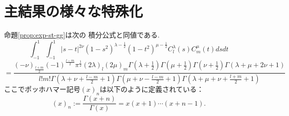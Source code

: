 \documentclass[pdf,notes]{beamer}
\newenvironment{taggedprop}[1]
 {\renewcommand\thetaggedpropx{#1}\taggedpropx}
  {\endtaggedpropx}
\begin{document}
\section{主結果の様々な特殊化}
\begin{frame}
	命題\ref{prop:exp-st-gg}は次の
	積分公式と同値である.
	\begin{taggedprop}{$\;1'$}
		\label{prop:int-st-gg}
		\begin{equation*}
			\int_{- 1}^1 \int_{- 1}^1 | s - t |^{2 \nu} (1 - s^2)^{\lambda - \frac{1}{2}}
			(1 - t^2)^{\mu - \frac{1}{2}} C_l^{\lambda} (s) C_m^{\mu} (t) d s d t
		\end{equation*}
		{\scriptsize
		\begin{equation}
			=\frac{(- \nu)_{\frac{l + m}{2}} (- 1)^{\frac{l - m}{2}} \pi^{\frac{1}{2}} (2
			\lambda)_l (2 \mu)_m \Gamma \left( \lambda + \frac{1}{2} \right) \Gamma \left(
			\mu + \frac{1}{2} \right) \Gamma \left( \nu + \frac{1}{2} \right) \Gamma
		(\lambda + \mu + 2 \nu + 1)}{l!m! \Gamma \left( \lambda + \nu + \frac{l -
		m}{2} + 1 \right) \Gamma \left( \mu + \nu - \frac{l - m}{2} + 1 \right) \Gamma
		\left( \lambda + \mu + \nu + \frac{l + m}{2} + 1 \right)}
			\label{eqn:int-st-gg}
			\tag{1$'$}
		\end{equation}
		}
	\end{taggedprop}
	ここでポッホハマー記号$(x)_n$は以下のように定義されている：\begin{equation*}
		(x)_n:=\frac{\Gamma(x+n)}{\Gamma(x)}=x(x+1)\cdots(x+n-1).
	\end{equation*}
\end{frame}
\end{document}
